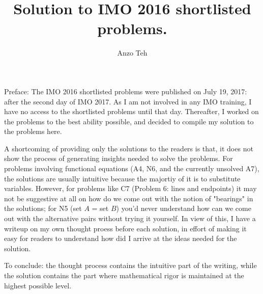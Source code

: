 \documentclass[11pt,a4paper]{article}
\begin{document}
\newcommand{\la}{\leftarrow}
\newcommand{\lra}{\leftrightarrow}


\title{Solution to IMO 2016 shortlisted problems.}
\author{Anzo Teh}
\date{}
\maketitle

Preface: 
The IMO 2016 shortlisted problems were published on July 19, 2017: after the second day of IMO 2017. As I am not involved in any IMO training, I have no access to the shortlisted problems until that day. Thereafter, I worked on the problems to the best ability possible, and decided to compile my solution to the problems here. 

A shortcoming of providing only the solutions to the readers is that, it does not show the process of generating insights needed to solve the problems. 
For problems involving functional equations (A4, N6, and the currently unsolved A7), the solutions are usually intuitive because the majortiy of it is to substitute variables. 
However, for problems like C7 (Problem 6: lines and endpoints) it may not be suggestive at all on how do we come out with the notion of "bearings" in the solutions; for N5 (set $A$ = set $B$) you'd never understand how can we come out with the alternative pairs without trying it yourself. 
In view of this, I have a writeup on my own thought proess before each solution, in effort of making it easy for readers to understand how did I arrive at the ideas needed for the solution. 

To conclude: the thought process contains the intuitive part of the writing, while the solution contains the part where mathematical rigor is maintained at the highest possible level. 

\newpage
\end{document}
